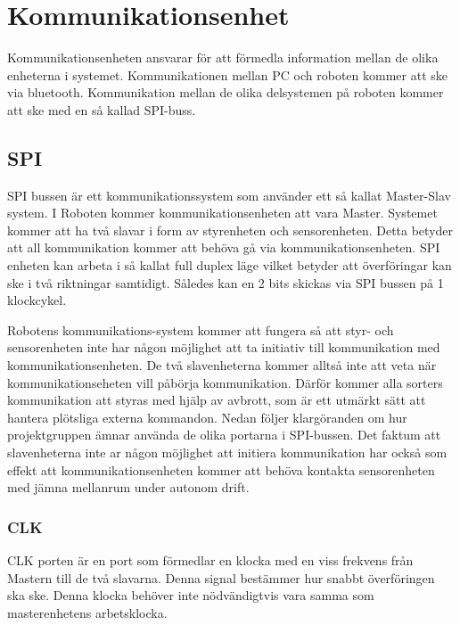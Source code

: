 \section{Kommunikationsenhet}
Kommunikationsenheten ansvarar för att förmedla information mellan de olika enheterna i systemet. 
Kommunikationen mellan PC och roboten kommer att ske via bluetooth. Kommunikation mellan de olika delsystemen på roboten kommer att ske med en så kallad SPI-buss.



\subsection{SPI}
SPI bussen är ett kommunikationssystem som använder ett så kallat Master-Slav system. I Roboten kommer kommunikationsenheten att vara Master. Systemet kommer att ha två slavar i form av styrenheten och sensorenheten.
Detta betyder att all kommunikation kommer att behöva gå via kommunikationsenheten. SPI enheten kan arbeta i så kallat full duplex läge vilket betyder att överföringar kan ske i två riktningar samtidigt. Således kan en 2 bits skickas via SPI bussen på 1 klockcykel.

Robotens kommunikations-system kommer att fungera så att styr- och sensorenheten inte har någon möjlighet att ta initiativ till kommunikation med kommunikationsenheten. De två slavenheterna kommer alltså inte att veta när kommunikationseheten vill påbörja kommunikation. Därför kommer alla sorters kommunikation att styras med hjälp av avbrott, som är ett utmärkt sätt att hantera plötsliga externa kommandon. 
Nedan följer klargöranden om hur projektgruppen ämnar använda de olika portarna i SPI-bussen. Det faktum att slavenheterna inte ar någon möjlighet att initiera kommunikation har också som effekt att kommunikationsenheten kommer att behöva kontakta sensorenheten med jämna mellanrum under autonom drift. 

\subsubsection{CLK}

CLK porten är en port som förmedlar en klocka med en viss frekvens från Mastern till de två slavarna. Denna signal bestämmer hur snabbt överföringen ska ske. Denna klocka behöver inte nödvändigtvis vara samma som masterenhetens arbetsklocka. 

